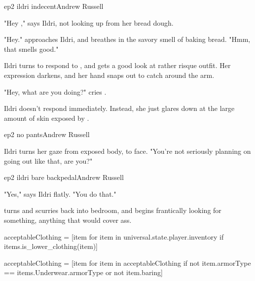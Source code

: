 \documentclass{book}
\begin{document}
\begin{childnode}{ep2 ildri indecent}{Andrew Russell}


    "Hey \nickname{}," says Ildri, not looking up from her bread dough.

    "Hey." \name{} approaches Ildri, and breathes in the savory smell of baking bread. "Hmm, that smells good."

    Ildri turns to respond to \name{}, and gets a good look at \names{} rather risque outfit. Her expression darkens, and her hand snaps out to catch \name{} around the arm.
    
    "Hey, what are you doing?" cries \name{}.

    Ildri doesn't respond immediately. Instead, she just glares down at the large amount of skin exposed by \names{} .


\end{childnode}

\begin{childnode}{ep2 no pants}{Andrew Russell}

    Ildri turns her gaze from \names{} exposed body, to \hisher{} face. "You're not seriously planning on going out like that, are you?"



\end{childnode}

\begin{childnode}{ep2 ildri bare backpedal}{Andrew Russell}

    "Yes," says Ildri flatly. "You do that."

    \name{} turns and scurries back into \hisher{} bedroom, and begins frantically looking for something, anything that would cover \hisher{} ass.

    \begin{code}

        acceptableClothing = [item for item in universal.state.player.inventory if items.is\_lower\_clothing(item)]

        acceptableClothing = [item for item in acceptableClothing if not item.armorType == items.Underwear.armorType or not item.baring]

    \end{code}



\end{childnode}
\end{document}
